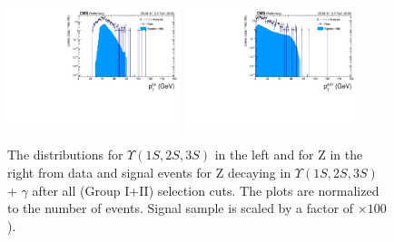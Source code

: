 \begin{figure}[!htbp]
\begin{center}
\includegraphics[width=0.45\textwidth]{figures_and_tables/outputPlots/ZtoUpsilon_Cat0_ZZZZZ/nEvts/data_x_mc/withKinCuts/h_withKin_Upsilon_Pt}\hspace*{1.cm}
\includegraphics[width=0.45\textwidth]{figures_and_tables/outputPlots/ZtoUpsilon_Cat0_ZZZZZ/nEvts/data_x_mc/withKinCuts/h_withKin_Z_Pt}
\end{center}\vspace*{-.5cm}
\caption{The \PT distributions for $\Upsilon(1S,2S,3S)$ in the left and for Z in the right from data and signal events for Z decaying in $\Upsilon(1S,2S,3S)$ + $\gamma$ after all (Group I+II) selection cuts. The plots are normalized to the number of events. Signal sample is scaled by a factor of $\times 100$).}
\label{fig:pTUpsilon_and_Z_ZtoUpsilon_Cat0_groupI_plus_II}
\end{figure}


